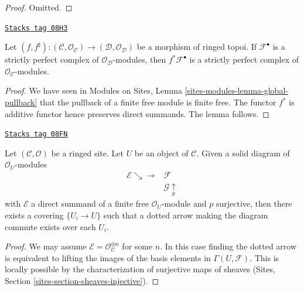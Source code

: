 \begin{proof}
Omitted.
\end{proof}

\begin{lemma}
\label{sites-cohomology-lemma-strictly-perfect-pullback}
\href{https://stacks.math.columbia.edu/tag/08H3}{\texttt{Stacks tag 08H3}}

Let $(f, f^\sharp) : (\mathcal{C}, \mathcal{O}_\mathcal{C}) \to
(\mathcal{D}, \mathcal{O}_\mathcal{D})$
be a morphism of ringed topoi. If $\mathcal{F}^\bullet$ is a strictly
perfect complex of $\mathcal{O}_\mathcal{D}$-modules, then
$f^*\mathcal{F}^\bullet$ is a strictly perfect complex of
$\mathcal{O}_\mathcal{C}$-modules.
\end{lemma}

\begin{proof}
We have seen in
Modules on Sites, Lemma \ref{sites-modules-lemma-global-pullback}
that the pullback of a finite free module is finite free. The functor
$f^*$ is additive functor hence preserves direct summands. The lemma follows.
\end{proof}

\begin{lemma}
\label{sites-cohomology-lemma-local-lift-map}
\href{https://stacks.math.columbia.edu/tag/08FN}{\texttt{Stacks tag 08FN}}

Let $(\mathcal{C}, \mathcal{O})$ be a ringed site. Let $U$ be an object of
$\mathcal{C}$. Given a solid diagram of $\mathcal{O}_U$-modules
$$
\begin{array}{cc}\mathcal{E} \searrow\longrightarrow & \mathcal{F} \\  & \mathcal{G} \underset{p}{\uparrow}\end{array}
$$
with $\mathcal{E}$ a direct summand of a finite free
$\mathcal{O}_U$-module and $p$ surjective, then there exists a
covering $\{U_i \to U\}$ such that a dotted arrow
making the diagram commute exists over each $U_i$.
\end{lemma}

\begin{proof}
We may assume $\mathcal{E} = \mathcal{O}_U^{\oplus n}$ for some $n$.
In this case finding the dotted arrow is equivalent to lifting the
images of the basis elements in $\Gamma(U, \mathcal{F})$. This is
locally possible by the characterization of surjective maps of
sheaves (Sites, Section \ref{sites-section-sheaves-injective}).
\end{proof}

